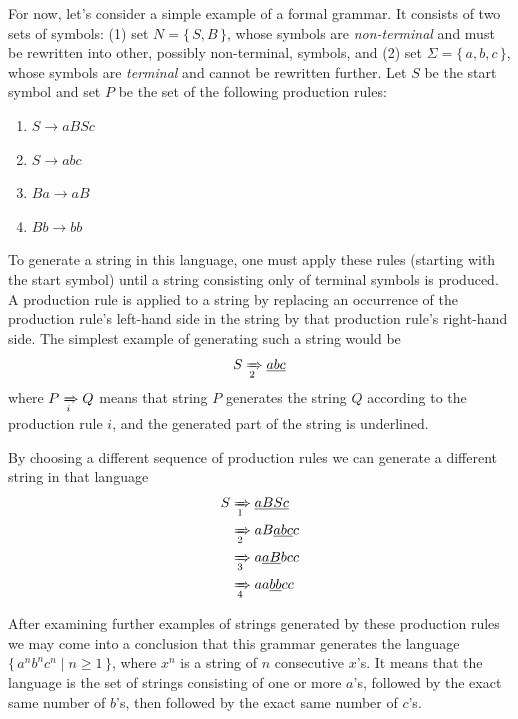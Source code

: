 \documentclass[english,bachelors,forcepolishlogotype]{wizthesis}
\begin{document}
For now, let's consider a simple example of a formal grammar. It consists of two
sets of symbols: (1) set $N = \{\,S, B\,\}$, whose symbols are
\emph{non-terminal} and must be rewritten into other, possibly non-terminal,
symbols, and (2) set $\Sigma = \{\,a, b, c\,\}$, whose symbols are
\emph{terminal} and cannot be rewritten further. Let $S$ be the start symbol
and set $P$ be the set of the following production rules:
\begin{enumerate}[noitemsep]
  \item $S \rightarrow aBSc$
  \item $S \rightarrow abc$
  \item $Ba \rightarrow aB$
  \item $Bb \rightarrow bb$
\end{enumerate}
To generate a string in this language, one must apply these rules (starting with
the start symbol) until a string consisting only of terminal symbols is
produced. A production rule is applied to a string by replacing an occurrence
of the production rule's left-hand side in the string by that production rule's
right-hand side. The simplest example of generating such a string would be
\begin{equation*}
  S \xRightarrow[2]{} \underline{abc}
\end{equation*}
where $P \xRightarrow[i]{} Q$ means that string $P$ generates the string $Q$
according to the production rule $i$, and the generated part of the string
is underlined.

By choosing a different sequence of production rules we can generate a different
string in that language
\begin{equation*}
\begin{split}
  S & \xRightarrow[1]{} \underline{aBSc} \\
    & \xRightarrow[2]{} aB\underline{abc}c \\
    & \xRightarrow[3]{} a\underline{aB}bcc \\
    & \xRightarrow[4]{} aa\underline{bb}cc
\end{split}
\end{equation*}

After examining further examples of strings generated by these production rules
we may come into a conclusion that this grammar generates the language
$\{\,a^nb^nc^n \mid n \ge 1\,\}$, where $x^n$ is a string of $n$ consecutive $x$'s.
It means that the language is the set of strings consisting of one or more
$a$'s, followed by the exact same number of $b$'s, then followed by the exact
same number of $c$'s.
\end{document}
